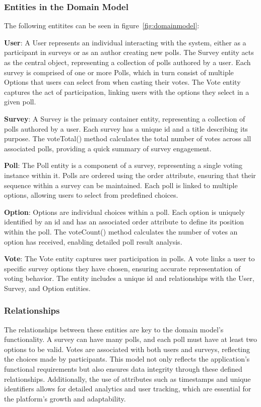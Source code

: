 \subsubsection*{Entities in the Domain Model}

The following entitites can be seen in figure~\ref{fig:domainmodel}:
\smallskip

\noindent
 \textbf{User}:
A User represents an individual interacting with the system, either as a participant in surveys or as an author creating new polls. The Survey entity acts as the central object, representing a collection of polls authored by a user. Each survey is comprised of one or more Polls, which in turn consist of multiple Options that users can select from when casting their votes. The Vote entity captures the act of participation, linking users with the options they select in a given poll.
\medskip

\noindent
 \textbf{Survey}:
A Survey is the primary container entity, representing a collection of polls authored by a user. Each survey has a unique id and a title describing its purpose. The voteTotal() method calculates the total number of votes across all associated polls, providing a quick summary of survey engagement.
\medskip

\noindent
 \textbf{Poll}:
The Poll entity is a component of a survey, representing a single voting instance within it. Polls are ordered using the order attribute, ensuring that their sequence within a survey can be maintained. Each poll is linked to multiple options, allowing users to select from predefined choices.
\medskip

\noindent
 \textbf{Option}:
Options are individual choices within a poll. Each option is uniquely identified by an id and has an associated order attribute to define its position within the poll. The voteCount() method calculates the number of votes an option has received, enabling detailed poll result analysis.
\medskip

\noindent
 \textbf{Vote}:
The Vote entity captures user participation in polls. A vote links a user to specific survey options they have chosen, ensuring accurate representation of voting behavior. The entity includes a unique id and relationships with the User, Survey, and Option entities.
\medskip

\noindent
\subsubsection*{Relationships}
\noindent
The relationships between these entities are key to the domain model's functionality. A survey can have many polls, and each poll must have at least two options to be valid. Votes are associated with both users and surveys, reflecting the choices made by participants. This model not only reflects the application's functional requirements but also ensures data integrity through these defined relationships. Additionally, the use of attributes such as timestamps and unique identifiers allows for detailed analytics and user tracking, which are essential for the platform's growth and adaptability.
\medskip

